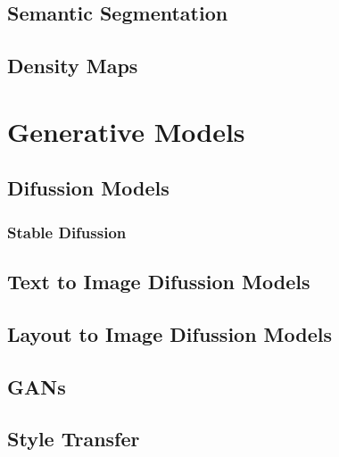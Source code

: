 \documentclass{report} %
\begin{document}
\chapter{Semantic Segmentation}

\chapter{Density Maps}


\part{Generative Models}
\chapter{Difussion Models}
\section{Stable Difussion}
\chapter{Text to Image Difussion Models}
\chapter{Layout to Image Difussion Models}

\chapter{GANs}

\chapter{Style Transfer}
\end{document}
